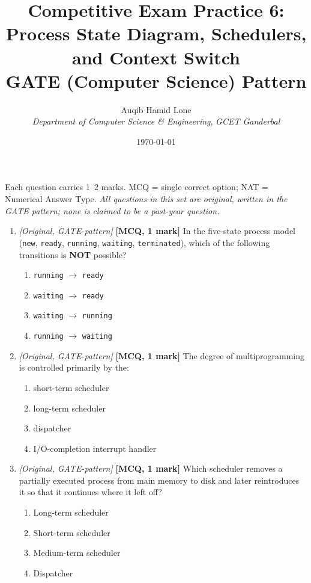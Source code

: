 \documentclass[11pt]{article}
\title{Competitive Exam Practice 6: Process State Diagram, Schedulers, and Context Switch\\\large GATE (Computer Science) Pattern}
\author{Auqib Hamid Lone\\[0.3em]
  \emph{Department of Computer Science \& Engineering}, \emph{GCET Ganderbal}}
\date{\today}
\begin{document}
\maketitle

\noindent Each question carries 1--2 marks. MCQ = single correct option; NAT = Numerical Answer Type. \emph{All questions in this set are original, written in the GATE pattern; none is claimed to be a past-year question.}

\begin{enumerate}
\item[\textbf{Q1}] \textit{[Original, GATE-pattern]} \textbf{[MCQ, 1 mark]} In the five-state process model (\texttt{new}, \texttt{ready}, \texttt{running}, \texttt{waiting}, \texttt{terminated}), which of the following transitions is \textbf{NOT} possible?

\begin{enumerate}
  \item[(A)] \texttt{running} $\to$ \texttt{ready}
  \item[(B)] \texttt{waiting} $\to$ \texttt{ready}
  \item[(C)] \texttt{waiting} $\to$ \texttt{running}
  \item[(D)] \texttt{running} $\to$ \texttt{waiting}
\end{enumerate}

\item[\textbf{Q2}] \textit{[Original, GATE-pattern]} \textbf{[MCQ, 1 mark]} The degree of multiprogramming is controlled primarily by the:

\begin{enumerate}
  \item[(A)] short-term scheduler
  \item[(B)] long-term scheduler
  \item[(C)] dispatcher
  \item[(D)] I/O-completion interrupt handler
\end{enumerate}

\item[\textbf{Q3}] \textit{[Original, GATE-pattern]} \textbf{[MCQ, 1 mark]} Which scheduler removes a partially executed process from main memory to disk and later reintroduces it so that it continues where it left off?

\begin{enumerate}
  \item[(A)] Long-term scheduler
  \item[(B)] Short-term scheduler
  \item[(C)] Medium-term scheduler
  \item[(D)] Dispatcher
\end{enumerate}


\end{enumerate}
\end{document}
